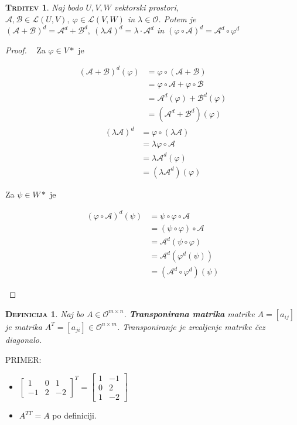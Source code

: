 \documentclass[a4paper,12pt]{article}
\newcommand{\A}{\mathcal{A}}
\newcommand{\OO}{\mathcal{O}}
\newcommand{\LL}{\mathcal{L}}
\newcommand{\B}{\mathcal{B}}
\newtheorem*{trditev}{\textsc{Trditev}}
\newtheorem*{definicija}{\textsc{Definicija}}
\begin{document}
\begin{trditev}
	Naj bodo $U,V,W$ vektorski prostori, $\A,\mathcal{B} \in \LL(U,V),~\varphi \in \LL(V,W)$ in $\lambda \in \OO$. Potem je $(\A + \mathcal{B})^d = \A^d + \mathcal{B}^d,~(\lambda \A)^d=\lambda \cdot \A^d$ in $(\varphi \circ \A)^d = \A^d \circ \varphi^d $
\end{trditev}

\begin{proof}~
	Za $\varphi \in V*$ je 	\begin{center}
		\begin{align*}
			(\A + \B)^d(\varphi)&= \varphi \circ (\A+\B) \\
			&= \varphi \circ \A + \varphi \circ \B \\
			&= \A^d(\varphi) + \B^d(\varphi) \\
			&= (\A^d+\B^d)(\varphi)
		\end{align*}
		\begin{align*}
			(\lambda \A)^d&= \varphi \circ (\lambda \A) \\
			&= \lambda \varphi \circ \A \\
			&= \lambda \A^d(\varphi) \\
			&= (\lambda \A^d)(\varphi)
		\end{align*}
	\end{center}
	\newpage 
	Za $\psi \in W*$ je 
	\begin{center}
		\begin{align*}
			(\varphi \circ \A)^d(\psi)&= \psi \circ \varphi \circ \A \\
			&= (\psi \circ \varphi)\circ \A \\
			&= \A^d(\psi \circ \varphi) \\
			&= \A^d(\varphi^d(\psi)) \\
			&= (\A^d\circ \varphi^d)(\psi)
		\end{align*}
	\end{center}
\end{proof}

\begin{definicija}
	Naj bo $A\in \OO^{m\times n}$. \textbf{Transponirana matrika} matrike $A=[a_{ij}]$ je matrika $A^T=[a_{ji}]\in \OO^{n\times m}$. Transponiranje je zrcaljenje matrike čez diagonalo. \\
\end{definicija}

PRIMER:
\begin{itemize}
	\item ${\begin{bmatrix}
		1&0&1\\
		-1&2&-2
	\end{bmatrix}}^T = 
	\begin{bmatrix}
		1&-1\\
		0&2\\
		1&-2
	\end{bmatrix}$
	\item $A^{TT}=A$ po definiciji. \\
\end{itemize}
\end{document}
